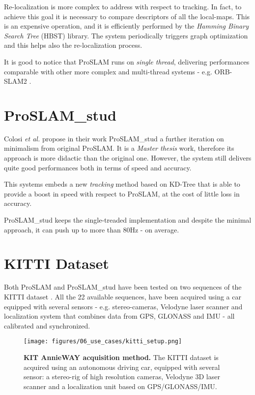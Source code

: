 Re-localization is more complex to address with respect to tracking. In fact, to achieve this goal it is necessary to compare descriptors of all the local-maps. This is an expensive operation, and it is efficiently performed by the \textit{Hamming Binary Search Tree} (HBST) \cite{schlegel2016hbst} library. The system periodically triggers graph optimization and this helps also the re-localization process.

It is good to notice that ProSLAM runs on \textit{single thread}, delivering performances comparable with other more complex and multi-thread systems - e.g. ORB-SLAM2 \cite{mur2017orb-slam2}.

\section{ProSLAM\_stud}\label{sec:froslam}
Colosi \textit{et al.} propose in their work ProSLAM\_stud \cite{colosi2017froslam} a further iteration on minimalism from original ProSLAM. It is a \textit{Master thesis} work, therefore its approach is more didactic than the original one. However, the system still delivers quite good performances both in terms of speed and accuracy. 

This systems embeds a new \textit{tracking} method based on KD-Tree that is able to provide a boost in speed with respect to ProSLAM, at the cost of little loss in accuracy.

ProSLAM\_stud keeps the single-treaded implementation and despite the minimal approach, it can push up to more than 80Hz - on average.

\section{KITTI Dataset}\label{sec:kitti}
Both ProSLAM and ProSLAM\_stud have been tested on two sequences of the KITTI dataset \cite{geiger2012kitti}. All the 22 available sequences, have been acquired using a car equipped with several sensors - e.g. stereo-cameras, Velodyne laser scanner and localization system that combines data from GPS, GLONASS and IMU - all calibrated and synchronized. 

\begin{figure}[!htb]
    \centering
    \texttt{[image: figures/06\_use\_cases/kitti\_setup.png]}
    \caption{\textbf{KIT AnnieWAY acquisition method.} The KITTI dataset is acquired using an autonomous driving car, equipped with several sensor: a stereo-rig of high resolution cameras, Velodyne 3D laser scanner and a localization unit based on GPS/GLONASS/IMU.}
    \label{fig:kit_annieway}
\end{figure}

